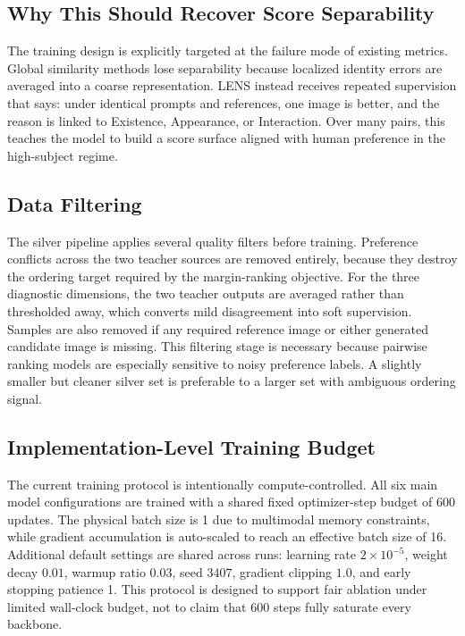 \subsection{Why This Should Recover Score Separability}
The training design is explicitly targeted at the failure mode of existing metrics. Global similarity methods lose separability because localized identity errors are averaged into a coarse representation. LENS instead receives repeated supervision that says: under identical prompts and references, one image is better, and the reason is linked to Existence, Appearance, or Interaction. Over many pairs, this teaches the model to build a score surface aligned with human preference in the high-subject regime.

\subsection{Data Filtering}
The silver pipeline applies several quality filters before training. Preference conflicts across the two teacher sources are removed entirely, because they destroy the ordering target required by the margin-ranking objective. For the three diagnostic dimensions, the two teacher outputs are averaged rather than thresholded away, which converts mild disagreement into soft supervision. Samples are also removed if any required reference image or either generated candidate image is missing. This filtering stage is necessary because pairwise ranking models are especially sensitive to noisy preference labels. A slightly smaller but cleaner silver set is preferable to a larger set with ambiguous ordering signal.

\subsection{Implementation-Level Training Budget}
The current training protocol is intentionally compute-controlled. All six main model configurations are trained with a shared fixed optimizer-step budget of 600 updates. The physical batch size is 1 due to multimodal memory constraints, while gradient accumulation is auto-scaled to reach an effective batch size of 16. Additional default settings are shared across runs: learning rate $2\times 10^{-5}$, weight decay $0.01$, warmup ratio $0.03$, seed $3407$, gradient clipping $1.0$, and early stopping patience 1. This protocol is designed to support fair ablation under limited wall-clock budget, not to claim that 600 steps fully saturate every backbone.

